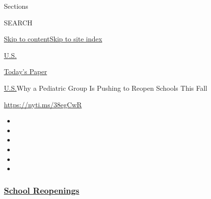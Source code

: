 Sections

SEARCH

\protect\hyperlink{site-content}{Skip to
content}\protect\hyperlink{site-index}{Skip to site index}

\href{https://www.nytimes3xbfgragh.onion/section/us}{U.S.}

\href{https://myaccount.nytimes3xbfgragh.onion/auth/login?response_type=cookie\&client_id=vi}{}

\href{https://www.nytimes3xbfgragh.onion/section/todayspaper}{Today's
Paper}

\href{/section/us}{U.S.}\textbar{}Why a Pediatric Group Is Pushing to
Reopen Schools This Fall

\url{https://nyti.ms/38egCwR}

\begin{itemize}
\item
\item
\item
\item
\item
\item
\end{itemize}

\hypertarget{school-reopenings}{%
\subsubsection{\texorpdfstring{\href{https://www.nytimes3xbfgragh.onion/spotlight/schools-reopening?name=styln-coronavirus-schools-reopening\&region=TOP_BANNER\&block=storyline_menu_recirc\&action=click\&pgtype=Article\&impression_id=920d1310-f4c0-11ea-9104-ef0fbb1bedd5\&variant=undefined}{School
Reopenings}}{School Reopenings}}\label{school-reopenings}}

